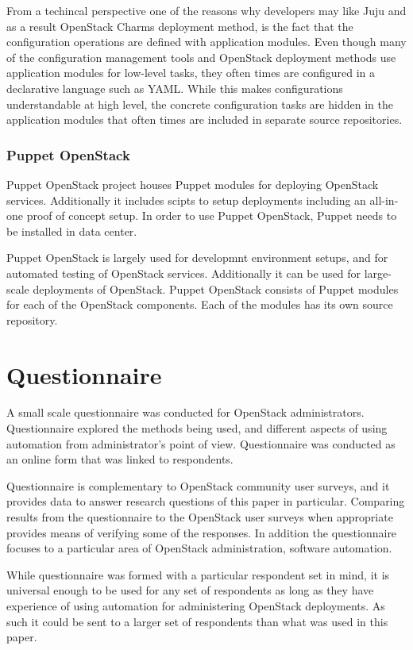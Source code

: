 \documentclass[officiallayout]{tktla}
\begin{document}
From a techincal perspective one of the reasons why developers may like Juju
and as a result OpenStack Charms deployment method, is the fact that the
configuration operations are defined with application modules. Even though many
of the configuration management tools and OpenStack deployment methods use
application modules for low-level tasks, they often times are configured in a
declarative language such as YAML. While this makes configurations
understandable at high level, the concrete configuration tasks are hidden in
the application modules that often times are included in separate source
repositories.

\subsection{Puppet OpenStack}

Puppet OpenStack project houses Puppet \cite{puppet-deployment-guide} modules
for deploying OpenStack services. Additionally it includes scipts to setup
deployments including an all-in-one proof of concept setup. In order to use
Puppet OpenStack, Puppet needs to be installed in data center.

Puppet OpenStack is largely used for developmnt environment setups, and for
automated testing of OpenStack services. Additionally it can be used for
large-scale deployments of OpenStack. Puppet OpenStack consists of Puppet
modules for each of the OpenStack components. Each of the modules has its own
source repository.

\chapter{Questionnaire} \label{questionnaire}

A small scale questionnaire was conducted for OpenStack administrators.
Questionnaire explored the methods being used, and different aspects of using
automation from administrator's point of view. Questionnaire was conducted as
an online form that was linked to respondents.

Questionnaire is complementary to OpenStack community user surveys, and it
provides data to answer research questions of this paper in particular.
Comparing results from the questionnaire to the OpenStack user surveys when
appropriate provides means of verifying some of the responses. In addition the
questionnaire focuses to a particular area of OpenStack administration,
software automation.

While questionnaire was formed with a particular respondent set in mind, it is
universal enough to be used for any set of respondents as long as they have
experience of using automation for administering OpenStack deployments. As such
it could be sent to a larger set of respondents than what was used in this
paper.
\end{document}
